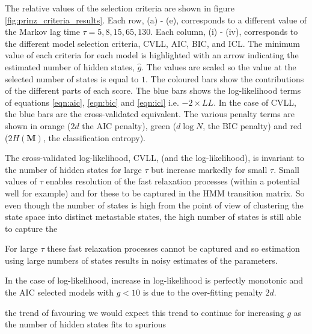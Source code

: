 The relative values of the selection criteria are shown in figure \ref{fig:prinz_criteria_results}. Each row, (a) - (e), corresponds to a different value of the Markov lag time $\tau=5, 8, 15, 65, 130$. Each column, (i) - (iv), corresponds to the different model selection criteria, CVLL, AIC, BIC, and ICL. The minimum value of each criteria for each model is highlighted with an arrow indicating the estimated number of hidden states, $\hat{g}$. The values are scaled so the value at the selected number of states is equal to $1$.  The coloured bars show the contributions of the different parts of each score. The blue bars shows the log-likelihood terms of equations \ref{eqn:aic}, \ref{eqn:bic} and \ref{eqn:icl} i.e.  $-2\times LL$. In the case of CVLL, the blue bars are the  cross-validated equivalent. The various penalty terms are shown in orange ($2d$ the AIC penalty), green ($d\log{N}$, the BIC penalty) and red ($2H(\mathbf{M})$, the classification entropy).  

The cross-validated log-likelihood, CVLL, (and the log-likelihood),  is invariant to the number of hidden states for large $\tau$ but increase markedly for small $\tau$.  Small values of $\tau$ enables resolution of the fast relaxation processes (within a potential well for example) and for these to be captured in the HMM transition matrix. So even though the number of states is high from the point of view of clustering the state space into distinct metastable states, the high number of states is still able to capture the 

For large $\tau$ these fast relaxation processes cannot be captured and so estimation using large numbers of states results in noisy estimates of the parameters. 

In the case of log-likelihood, increase in log-likelihood is perfectly monotonic and the AIC selected models with $g < 10$ is due to the over-fitting penalty $2d$.

the trend of favouring  we would expect this trend to continue for increasing $g$ as the number of hidden states fits to spurious 



